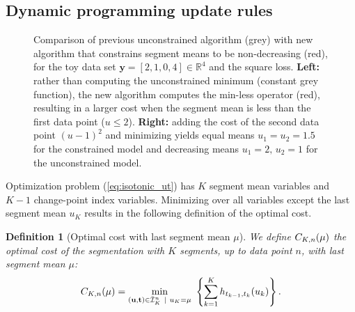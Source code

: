 \documentclass{article}
\newtheorem{definition}{Definition}
\newcommand{\RR}{\mathbb R}
\begin{document}
\subsection{Dynamic programming update rules}

\begin{figure}[b!]
  \centering
  
  
  \vskip -0.5cm
  \caption{Comparison of previous unconstrained algorithm (grey) with
    new algorithm that constrains segment means to be non-decreasing (red),
    for the toy data set $\mathbf y= [ 2, 1, 0, 4 ] \in\RR^4$ and the
    square loss. \textbf{Left:} rather than computing the
    unconstrained minimum (constant grey function), the new algorithm
    computes the min-less operator (red), resulting in a larger cost
    when the segment mean is less than the first data point
    ($u\leq 2$). \textbf{Right:} adding the cost of the second data
    point $(u-1)^2$ and minimizing yields equal means
    $u_1=u_2=1.5$ for the constrained model and decreasing 
    means $u_1=2,\, u_2=1$ for the unconstrained model.}
  \label{fig:compare-unconstrained}
\end{figure}

Optimization problem (\ref{eq:isotonic_ut}) has $K$ segment mean
variables and $K-1$ change-point index variables. Minimizing over all
variables except the last segment mean $u_K$ results in the following
definition of the optimal cost.



\begin{definition}[Optimal cost with last segment mean $\mu$]
\label{def:fcc}
  We define $C_{K,n}(\mu)$ the optimal cost of the segmentation
  with $K$ segments, up to data point $n$, with last segment mean
  $\mu$:
\begin{equation}
C_{K,n}(\mu) = \min_{(\mathbf u, \mathbf t)\in\bar{\mathcal I}^n_K \ | \ u_K = \mu} \
  \left\{ \sum_{k=1}^K
  h_{t_{k-1}, t_k}(u_k) \right\}.
\end{equation}
\end{definition}
\end{document}
